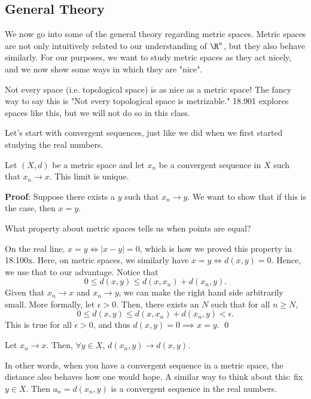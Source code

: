 
\subsection*{General Theory}
We now go into some of the general theory regarding metric spaces. Metric spaces are not only intuitively related to our understanding of $\R^n$, but they also behave similarly. For our purposes, we want to study metric spaces as they act nicely, and we now show some ways in which they are "nice".
\begin{remark}
Not every space (i.e. topological space) is as nice as a metric space! The fancy way to say this is "Not every topological space is metrizable." 18.901 explores spaces like this, but we will not do so in this class.
\end{remark}

Let's start with convergent sequences, just like we did when we first started studying the real numbers.
\begin{proposition}
Let $(X,d)$ be a metric space and let $x_n$ be a convergent sequence in $X$ such that $x_n\to x$. This limit is unique.
\end{proposition}
\textbf{Proof}: Suppose there exists a $y$ such that $x_n \to y$. We want to show that if this is the case, then $x=y$. 

\begin{question}
What property about metric spaces tells us when points are equal?
\end{question}
On the real line, $x=y \iff |x-y|=0$, which is how we proved this property in 18.100x. Here, on metric spaces, we similarly have $x=y \iff d(x,y) = 0$. Hence, we use that to our advantage. Notice that
\[
0 \leq d(x,y) \leq d(x, x_n) + d(x_n,y).
\]
Given that $x_n \to x$ and $x_n \to y$, we can make the right hand side arbitrarily small. More formally, let $\epsilon >0$. Then, there exists an $N$ such that for all $n\geq N$,
\[
0 \leq d(x,y) \leq d(x, x_n) + d(x_n,y)<\epsilon.
\]
This is true for all $\epsilon>0$, and thus $d(x,y) = 0 \implies x=y$. \qed 

\begin{proposition}
Let $x_n\to x$. Then, $\forall y\in X$, $d(x_n,y) \to d(x,y)$. 
\end{proposition}
In other words, when you have a convergent sequence in a metric space, the distance also behaves how one would hope. A similar way to think about this: fix $y\in X$. Then $a_n =d(x_n,y)$ is a convergent sequence in the real numbers.

